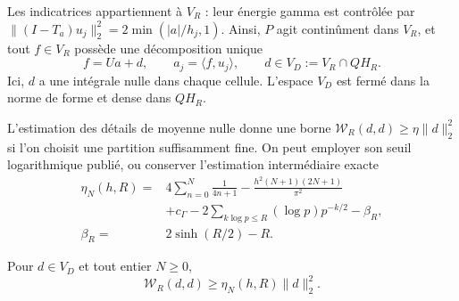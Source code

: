Les indicatrices appartiennent à \(V_R\) : leur énergie gamma est contrôlée par \(\|(I-T_a)u_j\|_2^2=2\min(|a|/h_j,1)\). Ainsi, \(P\) agit continûment dans \(V_R\), et tout \(f\in V_R\) possède une décomposition unique
\begin{equation}
f=Ua+d,\qquad a_j=\langle f,u_j\rangle,\qquad
d\in V_D:=V_R\cap QH_R.
\label{viii:schur-add-display-4}
\end{equation}
Ici, \(d\) a une intégrale nulle dans chaque cellule. L'espace \(V_D\) est
fermé dans la norme de forme et dense dans \(QH_R\).

L'estimation des détails de moyenne nulle donne une borne \(\mathscr W_R(d,d)\geq\eta\|d\|_2^2\) si l'on choisit une partition suffisamment fine. On peut employer son seuil logarithmique publié, ou conserver l'estimation intermédiaire exacte
\begin{equation}
\begin{aligned}
\eta_N(h,R)={}&4\sum_{n=0}^N\frac1{4n+1}
-\frac{h^2(N+1)(2N+1)}{\pi^2}\\
&+c_\Gamma-2\sum_{k\log p\leq R}(\log p)p^{-k/2}-\beta_R,\\
\beta_R={}&2\sinh(R/2)-R.
\end{aligned}
\label{viii:schur-add-eq-S1}
\end{equation}
\begin{lemma}
\label{viii:schur-add-retencion-detalles}
Pour \(d\in V_D\) et tout entier \(N\geq0\),
\[
\mathscr W_R(d,d)\geq\eta_N(h,R)\|d\|_2^2.
\]
\end{lemma}
